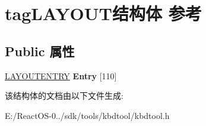 \hypertarget{structtag_l_a_y_o_u_t}{}\section{tag\+L\+A\+Y\+O\+U\+T结构体 参考}
\label{structtag_l_a_y_o_u_t}
\subsection*{Public 属性}
\begin{DoxyCompactItemize}
\item 
\mbox{\label{structtag_l_a_y_o_u_t_a010ccaf7ae2d3ac717cb48da5141c676}} 
\hyperlink{structtag_l_a_y_o_u_t_e_n_t_r_y}{L\+A\+Y\+O\+U\+T\+E\+N\+T\+RY} {\bfseries Entry} \mbox{[}110\mbox{]}
\end{DoxyCompactItemize}


该结构体的文档由以下文件生成\+:\begin{DoxyCompactItemize}
\item 
E\+:/\+React\+O\+S-\/0../sdk/tools/kbdtool/kbdtool.\+h\end{DoxyCompactItemize}
